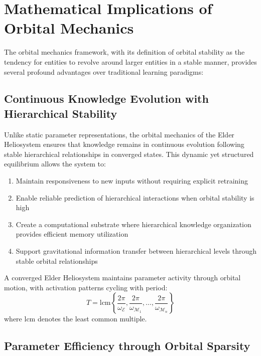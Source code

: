 \section{Mathematical Implications of Orbital Mechanics}

The orbital mechanics framework, with its definition of orbital stability as the tendency for entities to revolve around larger entities in a stable manner, provides several profound advantages over traditional learning paradigms:

\subsection{Continuous Knowledge Evolution with Hierarchical Stability}

Unlike static parameter representations, the orbital mechanics of the Elder Heliosystem ensures that knowledge remains in continuous evolution following stable hierarchical relationships in converged states. This dynamic yet structured equilibrium allows the system to:

\begin{enumerate}
    \item Maintain responsiveness to new inputs without requiring explicit retraining
    \item Enable reliable prediction of hierarchical interactions when orbital stability is high
    \item Create a computational substrate where hierarchical knowledge organization provides efficient memory utilization
    \item Support gravitational information transfer between hierarchical levels through stable orbital relationships
\end{enumerate}

\begin{theorem}
A converged Elder Heliosystem maintains parameter activity through orbital motion, with activation patterns cycling with period:
\begin{equation}
T = \text{lcm}\left\{\frac{2\pi}{\omega_{\mathcal{E}}}, \frac{2\pi}{\omega_{\mathcal{M}_1}}, \ldots, \frac{2\pi}{\omega_{\mathcal{M}_n}}\right\}
\end{equation}
where $\text{lcm}$ denotes the least common multiple.
\end{theorem}

\subsection{Parameter Efficiency through Orbital Sparsity}

